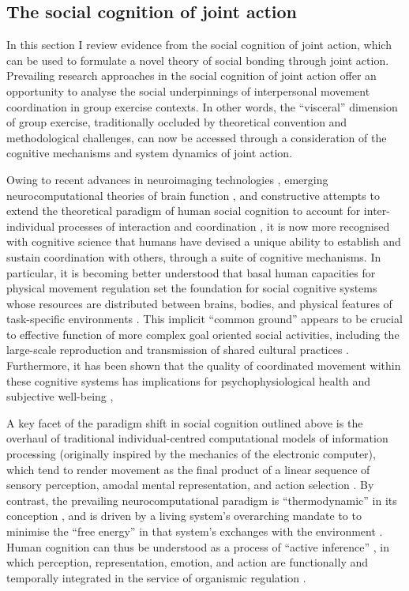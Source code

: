 \begin{CJK}{UTF8}{gbsn}
\subsection{The social cognition of joint action}

In this section I review evidence from the social cognition of joint action, which can be used to formulate a novel theory of social bonding through joint action.  Prevailing research approaches in the social cognition of joint action offer an opportunity to analyse the social underpinnings of interpersonal movement coordination in group exercise contexts.   In other words, the ``visceral'' dimension of group exercise, traditionally occluded by theoretical convention and methodological challenges, can now be accessed through a consideration of the cognitive mechanisms and system dynamics of joint action.

Owing to recent advances in neuroimaging technologies \citep{Frith2007}, emerging neurocomputational theories of brain function \citep{Yufik2013,Friston2010,Frith2010,Clark2013}, and constructive attempts to extend the theoretical paradigm of human social cognition to account for inter-individual processes of interaction and coordination \citep{Sebanz2006,Dale2014}, it is now more recognised with cognitive science that humans have devised a unique ability to establish and sustain coordination with others, through a suite of cognitive mechanisms.  In particular, it is becoming better understood that basal human capacities for physical movement regulation set the foundation for social cognitive systems whose resources are distributed between brains, bodies, and physical features of task-specific environments \citep{Hutchins2000,Kirsh2006,Semin2008,Semin2012,Coey2012}.  This implicit ``common ground'' appears to be crucial to effective function of more complex goal oriented social activities, including the large-scale reproduction and transmission of shared cultural practices \citep{Dunbar2012,Roepstorff2010,Claidiere2014,Launay2016}.  Furthermore, it has been shown that the quality of coordinated movement within these cognitive systems has implications for psychophysiological health and subjective well-being \citep{Wheatley2012},

A key facet of the paradigm shift in social cognition outlined above is the overhaul of traditional individual-centred computational models of information processing (originally inspired by the mechanics of the electronic computer), which tend to render movement as the final product of a linear sequence of sensory perception, amodal mental representation, and action selection \citep{Lewis2005}.  By contrast, the prevailing neurocomputational paradigm is ``thermodynamic'' in its conception \citep{Yufik2013}, and is driven by a living system's overarching mandate to to minimise the ``free energy'' in that system's exchanges with the environment \citep{Friston2010}.  Human cognition can thus be understood as a process of ``active inference'' \citep{Clark2013}, in which perception, representation, emotion, and action are functionally and temporally integrated in the service of organismic regulation \citep{Yufik2017}.


\end{CJK}
